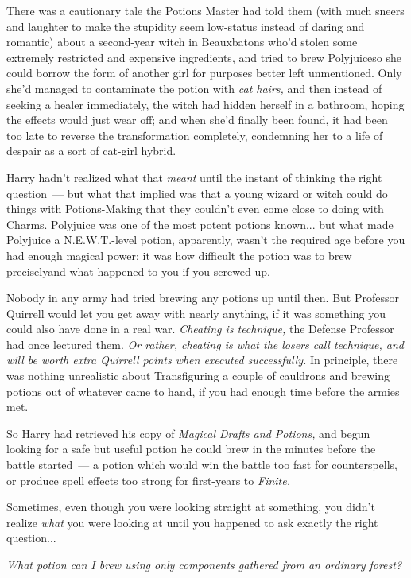There was a cautionary tale the Potions Master had told them (with much sneers and laughter to make the stupidity seem low-status instead of daring and romantic) about a second-year witch in Beauxbatons who'd stolen some extremely restricted and expensive ingredients, and tried to brew Polyjuiceso she could borrow the form of another girl for purposes better left unmentioned. Only she'd managed to contaminate the potion with \emph{cat hairs,} and then instead of seeking a healer immediately, the witch had hidden herself in a bathroom, hoping the effects would just wear off; and when she'd finally been found, it had been too late to reverse the transformation completely, condemning her to a life of despair as a sort of cat-girl hybrid.

Harry hadn't realized what that \emph{meant} until the instant of thinking the right question~--- but what that implied was that a young wizard or witch could do things with Potions-Making that they couldn't even come close to doing with Charms. Polyjuice was one of the most potent potions known... but what made Polyjuice a N.E.W.T.-level potion, apparently, wasn't the required age before you had enough magical power; it was how difficult the potion was to brew preciselyand what happened to you if you screwed up.

Nobody in any army had tried brewing any potions up until then. But Professor Quirrell would let you get away with nearly anything, if it was something you could also have done in a real war. \emph{Cheating is technique,} the Defense Professor had once lectured them. \emph{Or rather, cheating is what the losers call technique, and will be worth extra Quirrell points when executed successfully.} In principle, there was nothing unrealistic about Transfiguring a couple of cauldrons and brewing potions out of whatever came to hand, if you had enough time before the armies met.

So Harry had retrieved his copy of \emph{Magical Drafts and Potions,} and begun looking for a safe but useful potion he could brew in the minutes before the battle started~--- a potion which would win the battle too fast for counterspells, or produce spell effects too strong for first-years to \emph{Finite.}

Sometimes, even though you were looking straight at something, you didn't realize \emph{what} you were looking at until you happened to ask exactly the right question...

\emph{What potion can I brew using only components gathered from an ordinary forest?}

